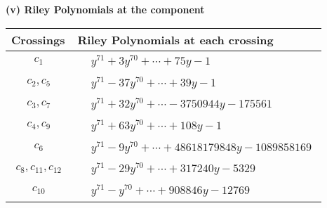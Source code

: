 \documentclass[1p]{elsarticle_modified}
\theoremstyle{definition}
\begin{document}
\flushleft \textbf{(v) Riley Polynomials at the component}\newline \\
\begin{tabular}{m{50pt}|m{274pt}}
Crossings & \hspace{64pt}Riley Polynomials at each crossing \\
\hline $$\begin{aligned}c_{1}\end{aligned}$$&$\begin{aligned}
&y^{71}+3 y^{70}+\cdots+75 y-1
\end{aligned}$\\
\hline $$\begin{aligned}c_{2},c_{5}\end{aligned}$$&$\begin{aligned}
&y^{71}-37 y^{70}+\cdots+39 y-1
\end{aligned}$\\
\hline $$\begin{aligned}c_{3},c_{7}\end{aligned}$$&$\begin{aligned}
&y^{71}+32 y^{70}+\cdots-3750944 y-175561
\end{aligned}$\\
\hline $$\begin{aligned}c_{4},c_{9}\end{aligned}$$&$\begin{aligned}
&y^{71}+63 y^{70}+\cdots+108 y-1
\end{aligned}$\\
\hline $$\begin{aligned}c_{6}\end{aligned}$$&$\begin{aligned}
&y^{71}-9 y^{70}+\cdots+48618179848 y-1089858169
\end{aligned}$\\
\hline $$\begin{aligned}c_{8},c_{11},c_{12}\end{aligned}$$&$\begin{aligned}
&y^{71}-29 y^{70}+\cdots+317240 y-5329
\end{aligned}$\\
\hline $$\begin{aligned}c_{10}\end{aligned}$$&$\begin{aligned}
&y^{71}- y^{70}+\cdots+908846 y-12769
\end{aligned}$\\
\hline
\end{tabular}\\~\\
\end{document}
